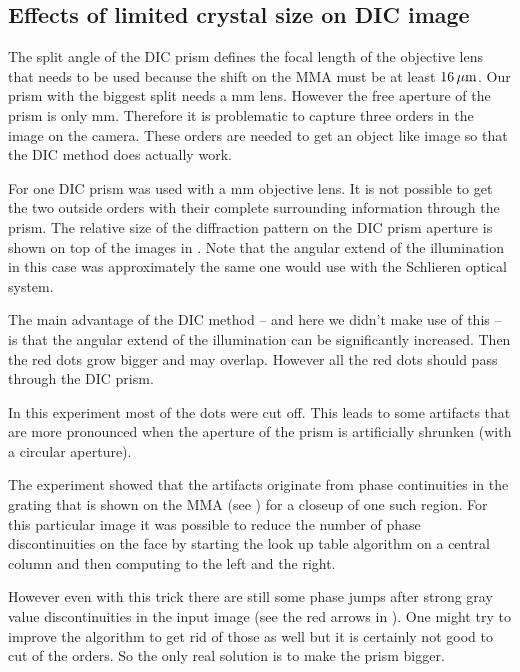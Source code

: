 \subsection{Effects of limited crystal size on DIC image}
\label{sec:size}
The split angle of the DIC prism defines the focal length of the
objective lens that needs to be used because the shift on the MMA must
be at least $\unit[16]{\mu m}$. Our prism with the biggest split needs
a \unit[200]{mm} lens. However the free aperture of the prism is only
\unit[10]{mm}. Therefore it is problematic to capture three orders in
the image on the camera. These orders are needed to get an object like
image so that the DIC method does actually work.

For  one DIC prism was used with a \unit[200]{mm}
objective lens. It is not possible to get the two outside orders with
their complete surrounding information through the prism. The relative
size of the diffraction pattern on the DIC prism aperture is shown on
top of the images in . Note that the angular extend
of the illumination in this case was approximately the same one would
use with the Schlieren optical system.

The main advantage of the DIC method -- and here we didn't make use of
this -- is that the angular extend of the illumination can be
significantly increased. Then the red dots grow bigger and may
overlap. However all the red dots should pass through the DIC prism.

In this experiment most of the dots were cut off. This leads to some
artifacts that are more pronounced when the aperture of the prism is
artificially shrunken (with a circular aperture).

The experiment showed that the artifacts originate from phase
continuities in the grating that is shown on the MMA (see
) for a closeup of one such region.
For this particular image it was possible to reduce the number of
phase discontinuities on the face by starting the look up table
algorithm on a central column and then computing to the left and the
right.

However even with this trick there are still some phase jumps after
strong gray value discontinuities in the input image (see the red
arrows in ). One might try to
improve the algorithm to get rid of those as well but it is certainly
not good to cut of the orders. So the only real solution is to make
the prism bigger.


